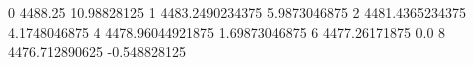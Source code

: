 0 4488.25 10.98828125
1 4483.2490234375 5.9873046875
2 4481.4365234375 4.1748046875
4 4478.96044921875 1.69873046875
6 4477.26171875 0.0
8 4476.712890625 -0.548828125
